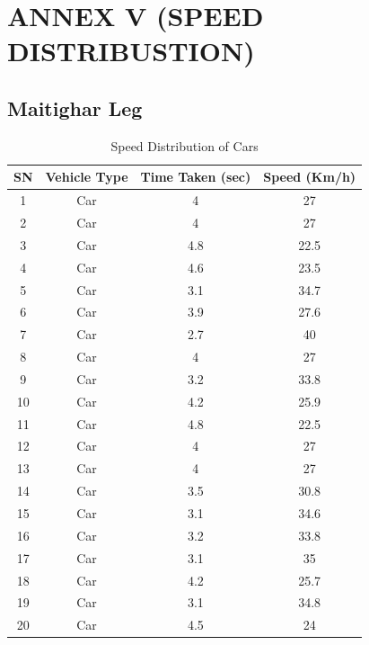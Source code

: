 \chapter{ANNEX V (SPEED DISTRIBUSTION)}

\section{Maitighar Leg}
\begin{table}[h!]
    \centering
    \caption{Speed Distribution of Cars}
    \begin{tabular}{|c|c|c|c|}
        \hline
        \textbf{SN}	& \textbf{Vehicle Type}	& \textbf{Time Taken (sec)}	& \textbf{Speed (Km/h)} \\ \hline
        1	&Car	&4	&27 \\ \hline
        2	&Car	&4	&27 \\ \hline
        3	&Car	&4.8	&22.5 \\ \hline
        4	&Car	&4.6	&23.5 \\ \hline
        5	&Car	&3.1	&34.7 \\ \hline
        6	&Car	&3.9	&27.6 \\ \hline
        7	&Car	&2.7	&40 \\ \hline
        8	&Car	&4	&27 \\ \hline
        9	&Car	&3.2	&33.8 \\ \hline
        10	&Car	&4.2	&25.9 \\ \hline
        11	&Car	&4.8	&22.5 \\ \hline
        12	&Car	&4	&27 \\  \hline
        13	&Car	&4	&27 \\ \hline
        14	&Car	&3.5	&30.8 \\ \hline
        15	&Car	&3.1	&34.6 \\ \hline
        16	&Car	&3.2	&33.8 \\ \hline
        17	&Car	&3.1	&35 \\ \hline
        18	&Car	&4.2	&25.7 \\ \hline
        19	&Car	&3.1	&34.8 \\ \hline
        20	&Car	&4.5	&24 \\  \hline
    \end{tabular}
\end{table}

